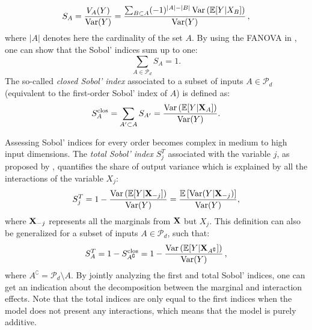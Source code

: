 \begin{equation}
    S_A = \frac{V_A(Y)}{\operatorname{Var}(Y)} = \frac{\sum_{B \subset A} (-1)^{|A| - |B|} \operatorname{Var}\left(\mathbb{E}[Y|X_B]\right)}{\operatorname{Var}(Y)}\, ,
    \label{eq:sobol}
\end{equation}
where $|A|$ denotes here the cardinality of the set $A$.
By using the FANOVA in , one can show that the Sobol' indices sum up to one: 
\begin{equation}
    \sum_{A \in \mathcal{P}_d} S_A = 1.
\end{equation}
The so-called \textit{closed Sobol' index} associated to a subset of inputs $A \in \mathcal{P}_d$ (equivalent to the first-order Sobol' index of $A$) is defined as: 
\begin{equation}
    S_A^{\mathrm{clos}} = \sum_{A' \subset A} S_{A'} = \frac{\operatorname{Var}\left(\mathbb{E}[Y|{\bf X}_{A}]\right)}{\operatorname{Var}(Y)}.
    \label{eq:sobol_clos}
\end{equation}

Assessing Sobol' indices for every order becomes complex in medium to high input dimensions. 
The \textit{total Sobol' index} $S_j^T$ associated with the variable $j$, as proposed by \citet{homma_1996}, quantifies the share of output variance which is explained by all the interactions of the variable $X_j$:
\begin{equation}
    S_j^T = 1 - \frac{\operatorname{Var}\left(\mathbb{E}[Y|{\bf X}_{-j}]\right)}{\operatorname{Var}(Y)} = \frac{\mathbb{E}\left[\operatorname{Var}(Y|{\bf X}_{-j})\right]}{\operatorname{Var}(Y)},
    \label{eq:sobol_total}
\end{equation}
where ${\bf X}_{-j}$ represents all the marginals from ${\bf X}$ but $X_j$. 
This definition can also be generalized for a subset of inputs $A \in \mathcal{P}_d$, such that:
\begin{equation}
    S_A^T = 1 - S_{A^{\complement}}^{\mathrm{clos}} = 1 - \frac{\operatorname{Var}\left(\mathbb{E}[Y|{\bf X}_{A^{\complement}}]\right)}{\operatorname{Var}(Y)} \, , 
\end{equation}
where $A^{\complement}=\mathcal{P}_d \setminus A$.
By jointly analyzing the first and total Sobol' indices, one can get an indication about the decomposition between the marginal and interaction effects. 
Note that the total indices are only equal to the first indices when the model does not present any interactions, which means that the model is purely additive.

